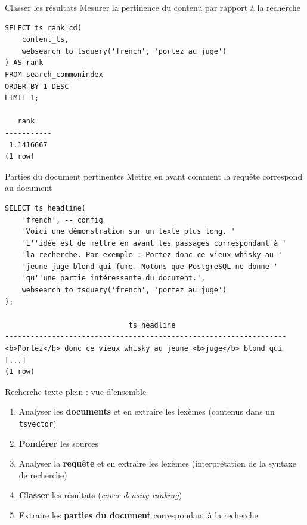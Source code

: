 \documentclass{beamer}
\begin{document}
\begin{frame}[fragile]{Classer les résultats}
    Mesurer la pertinence du contenu par rapport à la recherche
    \begin{verbatim}
SELECT ts_rank_cd(
    content_ts,
    websearch_to_tsquery('french', 'portez au juge')
) AS rank
FROM search_commonindex
ORDER BY 1 DESC
LIMIT 1;

   rank
-----------
 1.1416667
(1 row)
    \end{verbatim}
\end{frame}

\begin{frame}[fragile]{Parties du document pertinentes}
Mettre en avant comment la requête correspond au document
    \begin{verbatim}
SELECT ts_headline(
    'french', -- config
    'Voici une démonstration sur un texte plus long. '
    'L''idée est de mettre en avant les passages correspondant à '
    'la recherche. Par exemple : Portez donc ce vieux whisky au '
    'jeune juge blond qui fume. Notons que PostgreSQL ne donne '
    'qu''une partie intéressante du document.',
    websearch_to_tsquery('french', 'portez au juge')
);

                             ts_headline
------------------------------------------------------------------
<b>Portez</b> donc ce vieux whisky au jeune <b>juge</b> blond qui [...]
(1 row)
    \end{verbatim}
\end{frame}

\begin{frame}{Recherche texte plein : vue d'ensemble}
    \begin{enumerate}
        \item Analyser les \textbf{documents} et en extraire les lexèmes\newline
            (contenus dans un \texttt{tsvector})
        \item \textbf{Pondérer} les sources
        \item Analyser la \textbf{requête} et en extraire les lexèmes\newline
            (interprétation de la syntaxe de recherche)
        \item \textbf{Classer} les résultats (\textit{cover density ranking})
        \item Extraire les \textbf{parties du document} correspondant à la recherche
    \end{enumerate}
\end{frame}
\end{document}
